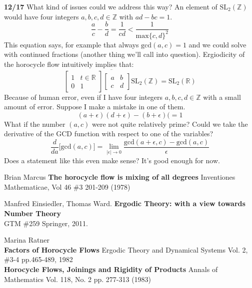 \documentclass[12pt]{article}
\begin{document}
\noindent \textbf{12/17} What kind of issues could we address this way?  An element of $\text{SL}_2(\mathbb{Z})$ would have four integers $a,b,c,d \in \mathbb{Z}$ with $ad-bc = 1$.  
$$ \frac{a}{c} - \frac{b}{d} = \frac{1}{cd} < \frac{1}{\text{max}\{c,d\}^2} $$
This equation says, for example that always $\text{gcd}(a,c) = 1$ and we could solve with continued fractions  (another thing we'll call into question). Ergiodicity of the horocycle flow intuitively implies that:
$$ 
\overline{\left[ \begin{array}{cr} 1 & t \in \mathbb{R} \\ 0 & 1 \end{array} \right]
\left[ \begin{array}{cc} a & b \\ c & d \end{array} \right] \text{SL}_2(\mathbb{Z})} = \text{SL}_2(\mathbb{R}) $$
Because of human error, even if I have four integers $a,b,c,d \in \mathbb{Z}$ with a small amount of error.  Suppose I make a mistake in one of them.  
$$ (a + \epsilon) (d + \epsilon) - (b + \epsilon)( = 1 $$
What if the number $(a,c)$ were not quite relatively prime?  Could we take the derivative of the GCD function with respect to one of the variables? 
$$ \frac{d}{da} \Big[ \text{gcd}(a,c) \Big]  = \lim_{|\epsilon| \to 0} \frac{\text{gcd}(a + \epsilon,c) - \text{gcd}(a,c)}{\epsilon} $$
Does a statement like this even make sense?  It's good enough for now.

\vfill
\begin{thebibliography}{} 

\item Brian Marcus \textbf{The horocycle flow is mixing of all degrees} Inventiones Mathematicae, Vol 46 \#3 201-209 (1978)

\item Manfred Einsiedler, Thomas Ward. \textbf{Ergodic Theory: with a view towards Number Theory} \\GTM \#259 Springer, 2011.

\item Marina Ratner \\ 
\textbf{Factors of Horocycle Flows}  Ergodic Theory and Dynamical Systems  Vol. 2, \#3-4 pp.465-489, 1982 \\
\textbf{Horocycle Flows, Joinings and Rigidity of Products} Annals of Mathematics Vol. 118, No. 2 pp. 277-313 (1983)

\end{thebibliography}
\end{document}
